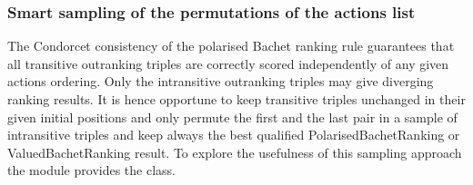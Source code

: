 \documentclass[a4paper,12pt,english]{sphinxhowto}
\begin{document}
\subsubsection{Smart sampling of the permutations of the actions list}
\label{\detokenize{pearls:smart-sampling-of-the-permutations-of-the-actions-list}}
\sphinxAtStartPar
The Condorcet consistency of the polarised Bachet ranking rule guarantees that all transitive outranking triples are correctly scored independently of any given actions ordering. Only the intransitive outranking triples may give diverging ranking results. It is hence opportune to keep transitive triples unchanged in their given initial positions and only permute the first and the last pair in a sample of intransitive triples and keep always the best qualified PolarisedBachetRanking or ValuedBachetRanking result. To explore the usefulness of this sampling approach the  module provides the  class.
\end{document}
